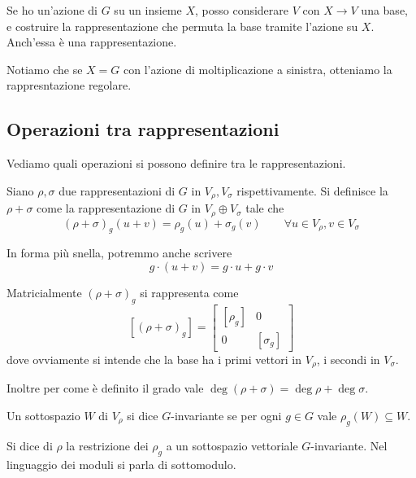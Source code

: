 	\begin{myexample}
		Se ho un'azione di $G$ su un insieme $X$, posso considerare $V$ con $X\rightarrow V$ una base, e costruire la rappresentazione che permuta la base tramite l'azione su $X$. Anch'essa è una rappresentazione.
		
		Notiamo che se $X=G$ con l'azione di moltiplicazione a sinistra, otteniamo la rappresntazione regolare.
	\end{myexample}

	\subsection{Operazioni tra rappresentazioni}
	Vediamo quali operazioni si possono definire tra le rappresentazioni.

	\begin{mydef}
		Siano $\rho, \sigma$ due rappresentazioni di $G$ in $V_\rho,V_\sigma$ rispettivamente. Si definisce la  $\rho+\sigma$ come la rappresentazione di $G$ in $V_\rho\oplus V_\sigma$ tale che 
		\[
		(\rho+\sigma)_g(u+v)=\rho_g(u)+\sigma_g(v)\qquad \forall u\in V_\rho, v\in V_\sigma
		\]
		
		In forma più snella, potremmo anche scrivere
		\[
		 g\cdot(u+v) = g\cdot u + g\cdot v
		\]

	\end{mydef}

	Matricialmente $(\rho+\sigma)_g$ si rappresenta come
	\[
		[(\rho+\sigma)_g]=\left[
			\begin{array}{c|c}
				[\rho_g] & 0 \\
				\hline
				0 & [\sigma_g]
			\end{array}
		\right]
	\]
	dove ovviamente si intende che la base ha i primi vettori in $V_\rho$, i secondi in $V_\sigma$.

	Inoltre per come è definito il grado vale $\deg(\rho+\sigma)=\deg\rho+\deg\sigma$.

	\begin{mydef}
		Un sottospazio $W$ di $V_\rho$ si dice $G$-invariante se per ogni $g\in G$ vale $\rho_g(W)\subseteq W$.
	\end{mydef}

	\begin{mydef}
		Si dice  di $\rho$ la restrizione dei $\rho_g$ a un sottospazio vettoriale $G$-invariante. Nel linguaggio dei moduli si parla di sottomodulo.
	\end{mydef}

